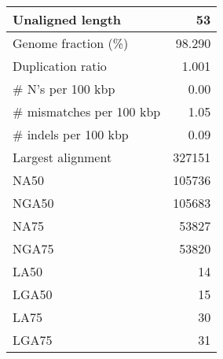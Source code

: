\documentclass[12pt,a4paper]{article}
\begin{document}
\begin{table}[ht]
\begin{center}
\begin{tabular}{|l*{1}{|r}|}
Unaligned length & 53 \\ \hline
Genome fraction (\%) & 98.290 \\ \hline
Duplication ratio & 1.001 \\ \hline
\# N's per 100 kbp & 0.00 \\ \hline
\# mismatches per 100 kbp & 1.05 \\ \hline
\# indels per 100 kbp & 0.09 \\ \hline
Largest alignment & 327151 \\ \hline
NA50 & 105736 \\ \hline
NGA50 & 105683 \\ \hline
NA75 & 53827 \\ \hline
NGA75 & 53820 \\ \hline
LA50 & 14 \\ \hline
LGA50 & 15 \\ \hline
LA75 & 30 \\ \hline
LGA75 & 31 \\ \hline
\end{tabular}
\end{center}
\end{table}
\end{document}
